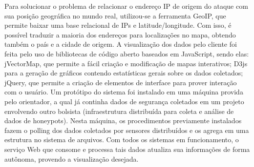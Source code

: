 \documentclass[%
        Portuguese,%
        ]
{ic-tese-v2}
\begin{document}
Para solucionar o problema de relacionar o endereço IP de origem do ataque com sua posição geográfica no mundo real, utilizou-se a ferramenta GeoIP, que permite baixar uma base relacional de IPs e latitude/longitude. Com isso, é possível traduzir a maioria dos endereços para localizações no mapa, obtendo também o país e a cidade de origem.
A visualização dos dados pelo cliente foi feita pelo uso de bibliotecas de código aberto baseados em JavaScript, sendo elas: jVectorMap, que permite a fácil criação e modificação de mapas interativos; D3js para a geração de gráficos contendo estatísticas gerais sobre os dados coletados; jQuery, que permite a criação de elementos de interface para prover interação com o usuário.
Um protótipo do sistema foi instalado em uma máquina provida pelo orientador, a qual já continha dados de segurança coletados em um projeto envolvendo outro bolsista (infraestrutura distribuída para coleta e análise de dados de honeypots). Nesta máquina, os procedimentos previamente instalados fazem o polling dos dados coletados por sensores distribuídos e os agrega em uma estrutura no sistema de arquivos. Com todos os sistemas em funcionamento, o serviço Web que consome e processa tais dados atualiza sua informações de forma autônoma, provendo a visualização desejada.
\end{document}
